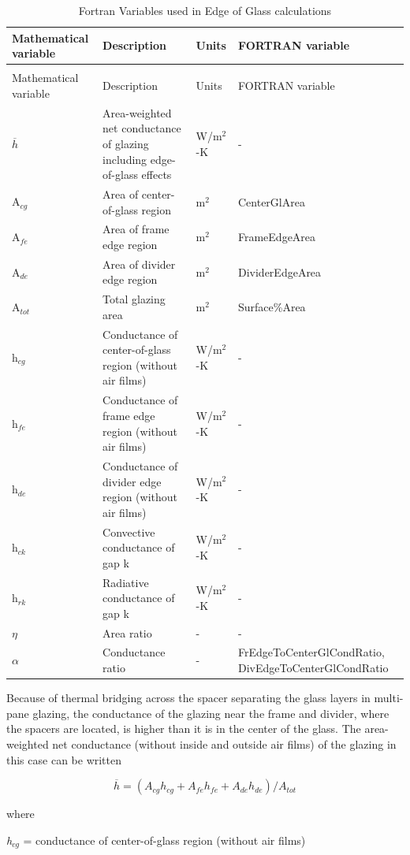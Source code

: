 \begin{longtable}[c]{p{1.0in}p{2.5in}p{1.0in}p{1.5in}}
\caption{Fortran Variables used in Edge of Glass calculations \label{table:fortran-variables-used-in-edge-of-glass}} \tabularnewline
\toprule 
Mathematical variable & Description & Units & FORTRAN variable \tabularnewline
\midrule
\endfirsthead

\caption[]{Fortran Variables used in Edge of Glass calculations} \tabularnewline
\toprule 
Mathematical variable & Description & Units & FORTRAN variable \tabularnewline
\midrule
\endhead

\(\overline h\) & Area-weighted net conductance of glazing including edge-of-glass effects & W/m\(^{2}\)-K & - \tabularnewline
A\(_{cg}\) & Area of center-of-glass region & m\(^{2}\) & CenterGlArea \tabularnewline
A\(_{fe}\) & Area of frame edge region & m\(^{2}\) & FrameEdgeArea \tabularnewline
A\(_{de}\) & Area of divider edge region & m\(^{2}\) & DividerEdgeArea \tabularnewline
A\(_{tot}\) & Total glazing area & m\(^{2}\) & Surface\%Area \tabularnewline
h\(_{cg}\) & Conductance of center-of-glass region (without air films) & W/m\(^{2}\)-K & - \tabularnewline
h\(_{fe}\) & Conductance of frame edge region (without air films) & W/m\(^{2}\)-K & - \tabularnewline
h\(_{de}\) & Conductance of divider edge region (without air films) & W/m\(^{2}\)-K & - \tabularnewline
h\(_{ck}\) & Convective conductance of gap k & W/m\(^{2}\)-K & - \tabularnewline
h\(_{rk}\) & Radiative conductance of gap k & W/m\(^{2}\)-K & - \tabularnewline
$\eta$ & Area ratio & - & - \tabularnewline
$\alpha$ & Conductance ratio & - & FrEdgeToCenterGlCondRatio, DivEdgeToCenterGlCondRatio \tabularnewline
\bottomrule
\end{longtable}

Because of thermal bridging across the spacer separating the glass layers in multi-pane glazing, the conductance of the glazing near the frame and divider, where the spacers are located, is higher than it is in the center of the glass. The area-weighted net conductance (without inside and outside air films) of the glazing in this case can be written

\begin{equation}
\overline h  = \left( {{A_{cg}}{h_{cg}} + {A_{fe}}{h_{fe}} + {A_{de}}{h_{de}}} \right)/{A_{tot}}
\end{equation}

where

\emph{h\(_{cg}\)} = conductance of center-of-glass region (without air films)

